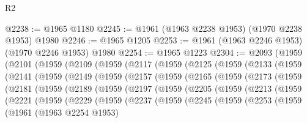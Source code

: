 \begin{lexlean}{R2}
\begin{coremodule}
@2238 := @1965 @1180
@2245 := @1961 (@1963 @2238 @1953) (@1970 @2238 @1953) @1980
@2246 := @1965 @1205
@2253 := @1961 (@1963 @2246 @1953) (@1970 @2246 @1953) @1980
@2254 := @1965 @1223
@2304 := @2093
    (@1959
      (@2101
        (@1959
          (@2109
            (@1959
              (@2117
                (@1959
                  (@2125
                    (@1959
                      (@2133
                        (@1959
                          (@2141
                            (@1959
                              (@2149
                                (@1959
                                  (@2157
                                    (@1959
                                      (@2165
                                        (@1959
                                          (@2173
                                            (@1959
                                              (@2181
                                                (@1959
                                                  (@2189
                                                    (@1959
                                                      (@2197
                                                        (@1959
                                                          (@2205
                                                            (@1959
                                                              (@2213
                                                                (@1959
                                                                  (@2221
                                                                    (@1959
                                                                      (@2229
                                                                        (@1959
                                                                          (@2237
                                                                            (@1959
                                                                              (@2245
                                                                                (@1959
                                                                                  (@2253
                                                                                    (@1959
                                                                                      (@1961
                                                                                        (@1963
                                                                                          @2254
                                                                                          @1953)

\end{coremodule}
\end{lexlean}
